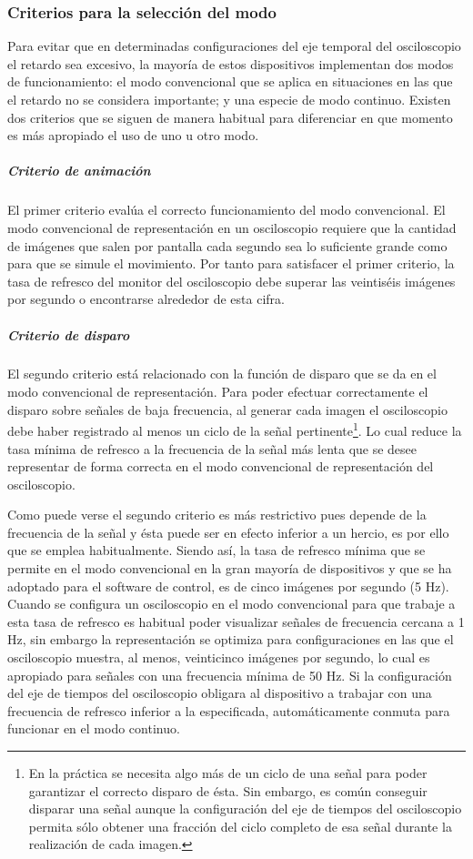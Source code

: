 \subsubsection{Criterios para la selección del modo}

Para evitar que en determinadas configuraciones del eje temporal del
osciloscopio el retardo sea excesivo, la mayoría de estos dispositivos
implementan dos modos de funcionamiento: el modo convencional que se aplica
en situaciones en las que el retardo no se considera importante; y una
especie de modo continuo. Existen dos criterios que se siguen de manera
habitual para diferenciar en que momento es más apropiado el uso de uno u
otro modo.


\subparagraph{Criterio de animación}

El primer criterio evalúa el correcto funcionamiento del modo convencional.
El modo convencional de representación en un osciloscopio requiere que la
cantidad de imágenes que salen por pantalla cada segundo sea lo suficiente
grande como para que se simule el movimiento. Por tanto para satisfacer el
primer criterio, la tasa de refresco del monitor del osciloscopio debe
superar las veintiséis imágenes por segundo o encontrarse alrededor de esta
cifra.


\subparagraph{Criterio de disparo}

El segundo criterio está relacionado con la función de disparo que se da en
el modo convencional de representación. Para poder efectuar correctamente
el disparo sobre señales de baja frecuencia, al generar cada imagen el
osciloscopio debe haber registrado al menos un ciclo de la señal
pertinente\footnote{En la práctica se necesita algo más de un ciclo de una
señal para poder garantizar el correcto disparo de ésta. Sin embargo, es
común conseguir disparar una señal aunque la configuración del eje de
tiempos del osciloscopio permita sólo obtener una fracción del ciclo
completo de esa señal durante la realización de cada imagen.}. Lo cual
reduce la tasa mínima de refresco a la frecuencia de la señal más lenta que
se desee representar de forma correcta en el modo convencional de
representación del osciloscopio.

Como puede verse el segundo criterio es más restrictivo pues depende de la
frecuencia de la señal y ésta puede ser en efecto inferior a un hercio, es
por ello que se emplea habitualmente. Siendo así, la tasa de refresco
mínima que se permite en el modo convencional en la gran mayoría de
dispositivos y que se ha adoptado para el software de control, es de cinco
imágenes por segundo (5 Hz). Cuando se configura un osciloscopio en el modo
convencional para que trabaje a esta tasa de refresco es habitual poder
visualizar señales de frecuencia cercana a 1 Hz, sin embargo la
representación se optimiza para configuraciones en las que el osciloscopio
muestra, al menos, veinticinco imágenes por segundo, lo cual es apropiado
para señales con una frecuencia mínima de 50 Hz. Si la configuración del
eje de tiempos del osciloscopio obligara al dispositivo a trabajar con una
frecuencia de refresco inferior a la especificada, automáticamente conmuta
para funcionar en el modo continuo.


